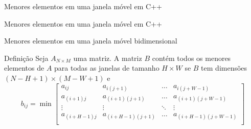 \begin{frame}[fragile]{Menores elementos em uma janela móvel em C++}
\end{frame}

\begin{frame}[fragile]{Menores elementos em uma janela móvel em C++}
\end{frame}

\begin{frame}[fragile]{Menores elementos em uma janela móvel bidimensional}

    \begin{block}{Definição}
        Seja $A_{N\times M}$ uma matriz. A matriz $B$ contém todos os menores elementos de $A$ para todas
        as janelas de tamanho $H\times W$ se $B$ tem dimensões $(N - H + 1)\times(M - W + 1)$ e
$$
        b_{ij} = \min \begin{bmatrix} 
            a_{ij} & a_{i(j + 1)} & \ldots & a_{i(j + W - 1)} \\
            a_{(i + 1)j} & a_{(i + 1)(j + 1)} & \ldots & a_{(i + 1)(j + W - 1)} \\
            \vdots & \vdots & \ddots & \vdots \\
            a_{(i + H - 1)j} & a_{(i + H - 1)(j + 1)} & \ldots & a_{(i + H - 1)(j + W - 1)} \\
        \end{bmatrix}
$$
    \end{block}

\end{frame}


